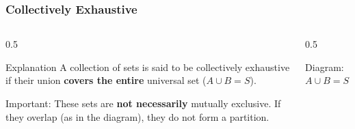 \begin{frame}
    \frametitle{Collectively Exhaustive}
    
    \begin{columns}[T]
        \begin{column}{0.5\textwidth}
            \begin{block}{Explanation}
                A collection of sets is said to be collectively exhaustive if their union \textbf{covers the entire} universal set (\(A \cup B = S\)).
                \vspace{1cm}
                
                Important: These sets are \textbf{not necessarily} mutually exclusive. If they overlap (as in the diagram), they do not form a partition.
            \end{block}
        \end{column}
        
        \begin{column}{0.5\textwidth}
            \begin{block}{Diagram: \(A \cup B=S\)}
                \centering
            \end{block}
        \end{column}
    \end{columns}
\end{frame}

